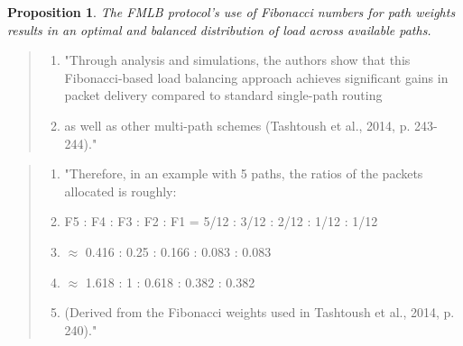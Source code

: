 \documentclass{article}
\newtheorem{proposition}{Proposition}
\begin{document}
\begin{itemize}
\begin{enumerate}
    \end{enumerate}
    \begin{proposition}
        The FMLB protocol's use of Fibonacci numbers for path weights results in an optimal and balanced distribution of load across available paths.
    \end{proposition}
    \begin{quote}
        \begin{enumerate}[label=(\arabic*)]
            \item "Through analysis and simulations, the authors show that this Fibonacci-based load balancing approach 
                  achieves significant gains in packet delivery compared to standard single-path routing
            \item as well as other multi-path schemes (Tashtoush et al., 2014, p. 243-244)."
        \end{enumerate}
    \end{quote}
    \begin{quote}
        \begin{enumerate}[label=(\arabic*)]
            \item "Therefore, in an example with 5 paths, the ratios of the packets allocated is roughly:
            \item F5 : F4 : F3 : F2 : F1 = 5/12 : 3/12 : 2/12 : 1/12 : 1/12
            \item $\approx$ 0.416 : 0.25 : 0.166 : 0.083 : 0.083
            \item $\approx$ 1.618 : 1 : 0.618 : 0.382 : 0.382
            \item (Derived from the Fibonacci weights used in Tashtoush et al., 2014, p. 240)."
        \end{enumerate}
    \end{quote}
\end{itemize}
\end{document}
